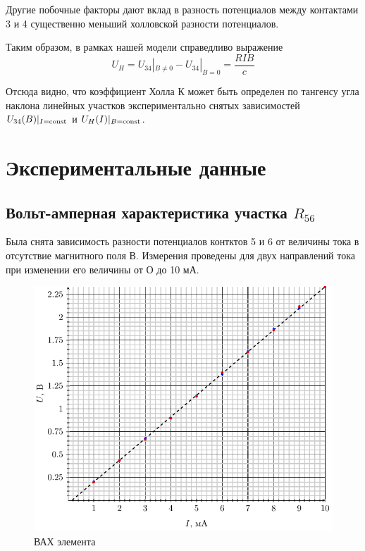 Другие побочные факторы дают вклад в разность потенциалов между контактами 3 и 4 существенно меньший холловской разности потенциалов. 

Таким образом, в рамках нашей модели справедливо выражение
\begin{equation}
	U_H=U_{34}|_{B\ne 0}-U_{34}|_{B= 0}=\frac{RIB}{c}
\end{equation}

Отсюда видно, что коэффициент Холла $К$ может быть определен по тангенсу угла наклона линейных участков экспериментально снятых зависимостей $U_{34}(B)|_{I=\text{\rmfamily\upshape const}}$ и $U_H(I)|_{B=\text{\rmfamily\upshape const}}$.

\section{Экспериментальные данные}
\subsection{Вольт-амперная характеристика участка $R_{56}$}

Была снята зависимость разности потенциалов контктов 5 и 6 от
величины тока в отсутствие магнитного поля В. Измерения проведены для
двух направлений тока при изменении его величины от О до 10 мА. 

\begin{figure}[H]
	\centering
	\includegraphics[width=\textwidth]{img/vax}
	\caption{ВАХ элемента}
	\label{fig:vax}
\end{figure}

